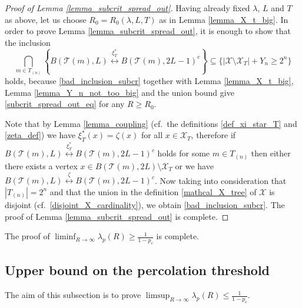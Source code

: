 \documentclass[a4paper,12pt]{article}
\begin{document}
\begin{proof}[Proof of Lemma  \ref{lemma_subcrit_spread_out}] Having already fixed $\lambda$, $L$ and $T$ as above, let us choose $R_0=R_0(\lambda,L,T)$ as in
Lemma \ref{lemma_X_t_big}. In order to prove Lemma  \ref{lemma_subcrit_spread_out},
it is enough to show that the inclusion
\begin{equation}\label{bad_inclusion_subcr}
  \bigcap_{m  \in T_{(n)}} \left\{  B(\mathcal{T}(m),  L ) \stackrel{ \xi^*_T }{\longleftrightarrow}  B(\mathcal{T}(m), 2L-1)^c \right\} \subseteq
  \{   |\mathcal{X} \setminus \mathcal{X}_T| + Y_n \geq  2^n   \}
\end{equation}
holds,
because \eqref{bad_inclusion_subcr} together with Lemma \ref{lemma_X_t_big}, Lemma \ref{lemma_Y_n_not_too_big} and the union bound give
\eqref{subcrit_spread_out_eq} for any $R \geq R_0$.

\smallskip

 Note that by Lemma \ref{lemma_coupling} (cf.\ the definitions \eqref{def_xi_star_T} and \eqref{zeta_def}) we have
$\xi^*_T(x)=\zeta(x)$ for all  $x \in \mathcal{X}_T$,
therefore if $B(\mathcal{T}(m),  L ) \stackrel{ \xi^*_T }{\longleftrightarrow}  B(\mathcal{T}(m), 2L-1)^c$ holds for some $m \in  T_{(n)}$ then either
there exists a vertex $x \in B(\mathcal{T}(m),2L) \setminus \mathcal{X}_T$ or we have
$B(\mathcal{T}(m),  L ) \stackrel{ \zeta }{\longleftrightarrow}  B(\mathcal{T}(m), 2L-1)^c$. Now taking into consideration that $|T_{(n)}|=2^n$
and that the union in the definition \eqref{mathcal_X_tree} of $\mathcal{X}$ is disjoint (cf.\ \eqref{disjoint_X_cardinality}),
we obtain \eqref{bad_inclusion_subcr}. The proof of Lemma  \ref{lemma_subcrit_spread_out} is complete.
\end{proof}

The proof of $\liminf_{R \to \infty } \lambda_p(R) \geq \frac{1}{1-p_c}$ is complete.












\subsection{Upper bound on the percolation threshold}
\label{subsection_upper_bound}

The aim of this subsection is to prove $\limsup_{R \to \infty } \lambda_p(R) \leq \frac{1}{1-p_c}$.
\end{document}
